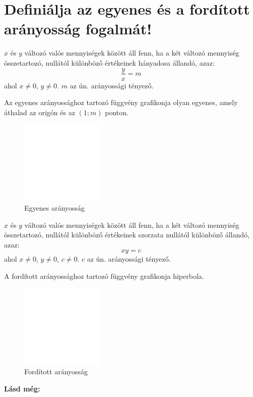 
\section{Definiálja az egyenes és a fordított arányosság fogalmát!}
\label{005}

\begin{defin}
$x$ és $y$ változó valós mennyiségek között  áll
fenn, ha a két változó mennyiség összetartozó, nullától különböző értékeinek
hányadosa állandó, azaz:
\[
\frac{y}{x} = m
\]
ahol $x \neq 0$, $y \neq 0$. $m$ az ún. arányossági tényező.

Az egyenes arányossághoz tartozó függvény grafikonja olyan egyenes, amely
áthalad az origón és az $(1; m)$ ponton.

\begin{figure}[!h]
	\centering
	\includegraphics[height=4cm]{../images/padder}
	\caption{Egyenes arányosság} 
\end{figure}
\end{defin}

\begin{defin}
$x$ és $y$ változó valós mennyiségek között 
áll fenn, ha a két változó mennyiség összetartozó, nullától különböző
értékeinek szorzata nullától különböző állandó, azaz:
\[
xy = c
\]
ahol $x \neq 0$, $y \neq 0$, $c \neq 0$. $c$ az ún. arányossági tényező.

A fordított arányossághoz tartozó függvény grafikonja hiperbola.

\begin{figure}[!h]
	\centering
	\includegraphics[height=4cm]{../images/padder}
	\caption{Fordított arányosság} 
	\label{fig:inverserate}
\end{figure}
\end{defin}

\textbf{Lásd még:}
